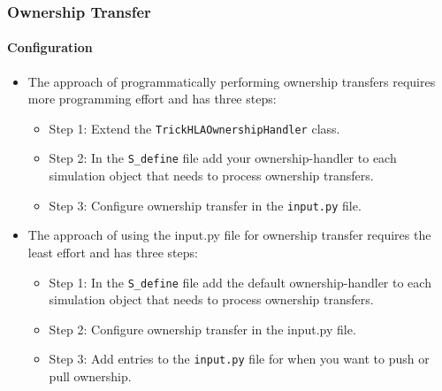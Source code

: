    \begin{frame}
      \frametitle{Ownership Transfer}
      \framesubtitle{Configuration}
      \begin{itemize}
         \item The approach of programmatically performing ownership transfers
         requires more programming effort and has three steps:
         \begin{itemize}
            \item Step 1: Extend the \texttt{TrickHLAOwnershipHandler} class.
            \item Step 2: In the \texttt{S\_define} file add your ownership-handler to
            each simulation object that needs to process ownership transfers.
            \item Step 3: Configure ownership transfer in the \texttt{input.py} file.
         \end{itemize}
         \item The approach of using the input.py file for ownership transfer
         requires the least effort and has three steps:
         \begin{itemize}
            \item Step 1: In the \texttt{S\_define} file add the default ownership-handler
            to each simulation object that needs to process ownership transfers.
            \item Step 2: Configure ownership transfer in the input.py file.
            \item Step 3: Add entries to the \texttt{input.py} file for when you
            want to push or pull ownership.
         \end{itemize}
      \end{itemize}
   \end{frame}

